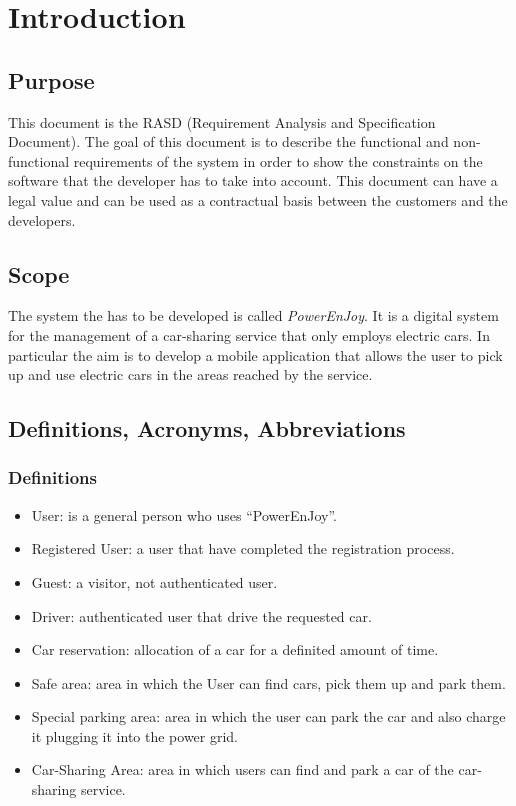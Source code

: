 
\section{Introduction}


\subsection{Purpose}

This document is the RASD (Requirement Analysis and Specification Document). The goal of this document is to describe the functional and non-functional requirements of the system in order to show the constraints on the software that the developer has to take into account. This document can have a legal value and can be used as a contractual basis between the customers and the developers.

\subsection{Scope}
The system the has to be developed is called \emph{PowerEnJoy}. It is a digital system for the management of a car-sharing service that only employs electric cars. In particular the aim is to develop a mobile application that allows the user to pick up and use electric cars in the areas reached by the service. 

\subsection{Definitions, Acronyms, Abbreviations}


\subsubsection{Definitions}
\begin{itemize}
	\item User: is a general person who uses ``PowerEnJoy''.
	\item Registered User: a user that have completed the registration process.
	\item Guest: a visitor, not authenticated user.
	\item Driver: authenticated user that drive the requested car.
	\item Car reservation: allocation of a car for a definited amount of time.


	\item Safe area: area in which the User can find cars, pick them up and park them.
	\item Special parking area: area in which the user can park the car and also charge it plugging it into the power grid. 
	\item Car-Sharing Area: area in which users can find and park a car of the car-sharing service.
	
\end{itemize}

